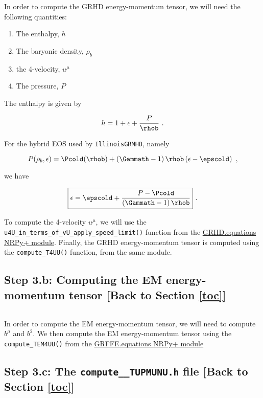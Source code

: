 \documentclass[landscape,letterpaper,10pt,english]{article}
\providecommand{\tightlist}{%
      \setlength{\itemsep}{0pt}\setlength{\parskip}{0pt}}
\begin{document}
In order to compute the GRHD energy-momentum tensor, we will need the
following quantities:

\begin{enumerate}
\def\labelenumi{\arabic{enumi}.}
\tightlist
\item
  The enthalpy, \(h\)
\item
  The baryonic density, \(\rho_{b}\)
\item
  the 4-velocity, \(u^{\mu}\)
\item
  The pressure, \(P\)
\end{enumerate}

The enthalpy is given by

\[
h = 1 + \epsilon + \frac{P}{\rhob}\ .
\]

For the hybrid EOS used by \texttt{IllinoisGRMHD}, namely

\[
P(\rho_{b},\epsilon) = \Pcold(\rhob) + \left(\Gammath-1\right)\rhob\left(\epsilon - \epscold\right)\ ,
\]

we have

\[
\boxed{\epsilon = \epscold + \frac{P-\Pcold}{\left(\Gammath-1\right)\rhob}}\ .
\]

To compute the 4-velocity \(u^{\mu}\), we will use the
\texttt{u4U\_in\_terms\_of\_vU\_apply\_speed\_limit()} function from the
\href{/edit/NRPyIGM/GRHD/equations.py}{GRHD.equations NRPy+ module}.
Finally, the GRHD energy-momentum tensor is computed using the
\texttt{compute\_T4UU()} function, from the same module.

    \subsection{\texorpdfstring{Step 3.b: Computing the EM energy-momentum
tensor {[}Back to
Section \ref{toc}{]}}{Step 3.b: Computing the EM energy-momentum tensor {[}Back to {]}}}\label{step-3.b-computing-the-em-energy-momentum-tensor-back-to-top}

\[\label{tmunu_em}\]

In order to compute the EM energy-momentum tensor, we will need to
compute \(b^{\mu}\) and \(b^{2}\). We then compute the EM
energy-momentum tensor using the \texttt{compute\_TEM4UU()} from the
\href{/edit/NRPyIGM/GRFFE/equations.py}{GRFFE.equations NRPy+ module}

    \subsection{\texorpdfstring{Step 3.c: The \texttt{compute\_\_TUPMUNU.h}
file {[}Back to
Section \ref{toc}{]}}{Step 3.c: The compute\_\_TUPMUNU.h file {[}Back to {]}}}\label{step-3.c-the-compute__tupmunu.h-file-back-to-top}
\end{document}

